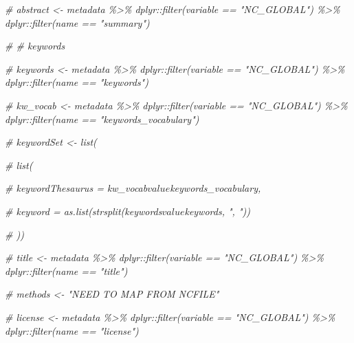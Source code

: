 \documentclass[
]{book}
\newenvironment{Shaded}{\begin{snugshade}}{\end{snugshade}}
\newcommand{\CommentTok}[1]{\textcolor[rgb]{0.56,0.35,0.01}{\textit{#1}}}
\begin{document}
\begin{Shaded}
\begin{Highlighting}[]
\CommentTok{\# abstract \textless{}{-} metadata \%\textgreater{}\% dplyr::filter(variable == "NC\_GLOBAL") \%\textgreater{}\% dplyr::filter(name == "summary")}
\end{Highlighting}
\end{Shaded}

\begin{Shaded}
\begin{Highlighting}[]
\CommentTok{\# \# keywords}

\CommentTok{\# keywords \textless{}{-} metadata \%\textgreater{}\% dplyr::filter(variable == "NC\_GLOBAL") \%\textgreater{}\% dplyr::filter(name == "keywords")}

\CommentTok{\# kw\_vocab \textless{}{-} metadata \%\textgreater{}\% dplyr::filter(variable == "NC\_GLOBAL") \%\textgreater{}\% dplyr::filter(name == "keywords\_vocabulary")}

\CommentTok{\# keywordSet \textless{}{-} list(}

\CommentTok{\#     list(}

\CommentTok{\#         keywordThesaurus = kw\_vocab$value$keywords\_vocabulary,}

\CommentTok{\#         keyword = as.list(strsplit(keywords$value$keywords, ", "))}

\CommentTok{\#         ))}
\end{Highlighting}
\end{Shaded}

\begin{Shaded}
\begin{Highlighting}[]
\CommentTok{\# title \textless{}{-} metadata \%\textgreater{}\% dplyr::filter(variable == "NC\_GLOBAL") \%\textgreater{}\% dplyr::filter(name == "title")}
\end{Highlighting}
\end{Shaded}

\begin{Shaded}
\begin{Highlighting}[]
\CommentTok{\# methods \textless{}{-} "NEED TO MAP FROM NCFILE"}
\end{Highlighting}
\end{Shaded}

\begin{Shaded}
\begin{Highlighting}[]
\CommentTok{\# license \textless{}{-} metadata \%\textgreater{}\% dplyr::filter(variable == "NC\_GLOBAL") \%\textgreater{}\% dplyr::filter(name == "license")}
\end{Highlighting}
\end{Shaded}
\end{document}
